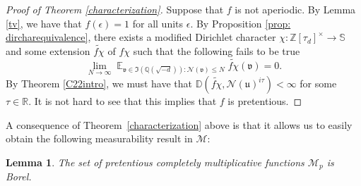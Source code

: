 \documentclass[11pt]{amsart}
\newtheorem{lemma}{Lemma}[section]
\newtheorem{theorem}[lemma]{Theorem}
\theoremstyle{definition}
\DeclareMathOperator*{\E}{\mathbb{E}}
\newcommand{\D}{{\mathbb D}}
\newcommand{\NN}{{\mathcal N}}
\newcommand{\Q}{{\mathbb Q}}
\newcommand{\R}{{\mathbb R}}
\renewcommand{\S}{\mathbb{S}}
\newcommand{\Z}{{\mathbb Z}}
\newcommand{\mf}{\mathfrak}
\newcommand{\e}{\epsilon}
\begin{document}
\begin{proof}[Proof of Theorem \ref{characterization}]  
Suppose that $f$ is not aperiodic. By  Lemma \ref{tv}, we have that $f(\e)=1$ for all units $\e$. By Proposition \ref{prop: dircharequivalence}, 
there exists a modified Dirichlet character $\chi\colon \Z[\tau_{d}]^{\times}\to\S$ and some 
         extension $\widetilde{f\chi}$ of $f\chi$ 
        such that the following fails to be true
        $$\lim_{N\to\infty}\E_{\mathfrak{v}\in \mathfrak{I}(\Q(\sqrt{-d}))\colon \NN(\mathfrak{v})\leq N}\widetilde{f\chi}(\mathfrak{v})=0.$$
 By Theorem \ref{C22intro}, we must have that $\D(\widetilde{f\chi},\NN(\mf u)^{i\tau})<\infty$ for some $\tau\in\R$.
 It is not hard to see that this implies that $f$ is  pretentious.
\end{proof}
A consequence of Theorem~\ref{characterization} above is that it allows us to easily obtain the following measurability result in $\mathcal{M}$:
\begin{lemma}\label{measurability}
The set of pretentious completely multiplicative functions $\mathcal{M}_p$ is Borel.
\end{lemma}
\end{document}
